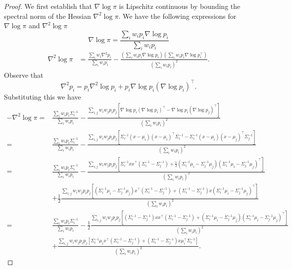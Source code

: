 \begin{proof}
We first establish that $\nabla\log\pi$ is Lipschitz continuous by bounding the spectral norm of the Hessian $\nabla^2 \log\pi$. We have the following expressions for $\nabla\log\pi$ and $\nabla^2 \log\pi$
\begin{equation*}
    \nabla\log\pi = \frac{\sum_i w_i p_i \nabla\log p_i}{\sum_i w_i p_i}
\end{equation*}
\begin{align}
    \nabla^2\log\pi & = \frac{\sum_i w_i \nabla^2 p_i}{\sum_i w_i p_i} -\frac{(\sum_i w_i p_i \nabla\log p_i) (\sum_i w_i p_i \nabla\log p_i^\intercal)}{(\sum_i w_i p_i)^2}.\label{eq:hessian_expression_gaussian_mixture_different_covariances}
\end{align}
Observe that 
\begin{equation*}
    \nabla^2 p_i =  p_i \nabla^2\log p_i + p_i  \nabla\log p_i (\nabla\log p_i)^{\intercal}.
\end{equation*}
Substituting this we have
\begin{align*}
    -\nabla^2\log\pi  =&  \frac{\sum_i w_i p_i \Sigma_i^{-1}}{\sum_i w_i p_i}-\frac{\sum_{i,j} w_iw_j p_i p_j [\nabla\log p_i (\nabla\log p_i)^\intercal-\nabla\log p_i (\nabla\log p_j)^\intercal]}{(\sum_i w_i p_i)^2} \\
    =&  \frac{\sum_i w_i p_i \Sigma_i^{-1}}{\sum_i w_i p_i}-\frac{\sum_{i,j} w_iw_j p_i p_j [\Sigma_i^{-1}(x-\mu_i)(x-\mu_i)^\intercal\Sigma_i^{-1} -\Sigma_i^{-1}(x-\mu_i)(x-\mu_j)^\intercal\Sigma_j^{-1}]}{(\sum_i w_i p_i)^2}\\
    =&  \frac{\sum_i w_i p_i \Sigma_i^{-1}}{\sum_i w_i p_i}-\frac{\sum_{i,j} w_iw_j p_i p_j [\Sigma_i^{-1}xx^\intercal(\Sigma_i^{-1}-\Sigma_j^{-1}) +\frac{1}{2}(\Sigma_i^{-1}\mu_i-\Sigma_j^{-1}\mu_j)(\Sigma_i^{-1}\mu_i-\Sigma_j^{-1}\mu_j)^\intercal]}{(\sum_i w_i p_i)^2}\\
    & + \frac{1}{2} \frac{\sum_{i,j} w_iw_j p_i p_j [(\Sigma_i^{-1}\mu_i -\Sigma_j^{-1}\mu_j)x^\intercal(\Sigma_i^{-1}-\Sigma_j^{-1}) + (\Sigma_i^{-1} -\Sigma_j^{-1})x(\Sigma_i^{-1}\mu_i -\Sigma_j^{-1}\mu_j)^\intercal]}{(\sum_i w_i p_i)^2}\\
    =&  \frac{\sum_i w_i p_i \Sigma_i^{-1}}{\sum_i w_i p_i}-\frac{1}{2}\frac{\sum_{i,j} w_iw_j p_i p_j [(\Sigma_i^{-1}-\Sigma_j^{-1})xx^\intercal(\Sigma_i^{-1}-\Sigma_j^{-1}) +(\Sigma_i^{-1}\mu_i-\Sigma_j^{-1}\mu_j)(\Sigma_i^{-1}\mu_i-\Sigma_j^{-1}\mu_j)^\intercal]}{(\sum_i w_i p_i)^2}\\
     & + \frac{\sum_{i,j} w_iw_j p_i p_j [\Sigma_i^{-1}\mu_ix^\intercal(\Sigma_i^{-1}-\Sigma_j^{-1}) + (\Sigma_i^{-1} -\Sigma_j^{-1})x\mu_i^\intercal \Sigma_i^{-1}]}{(\sum_i w_i p_i)^2}.

\end{align*}
\end{proof}
